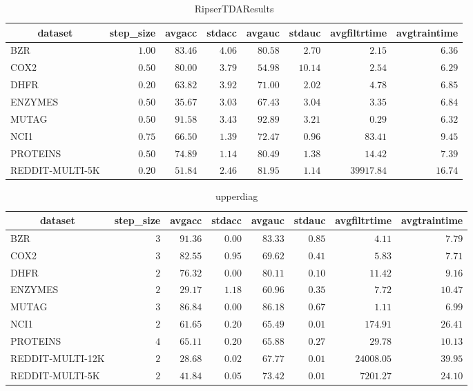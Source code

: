 \begin{table}[!tbp]
\caption{RipserTDAResults\label{RipserTDAResults}} 
{\centering
\begin{tabular}{lrrrrrrr}
\hline\hline
\multicolumn{1}{c}{dataset}&\multicolumn{1}{c}{step_size}&\multicolumn{1}{c}{avgacc}&\multicolumn{1}{c}{stdacc}&\multicolumn{1}{c}{avgauc}&\multicolumn{1}{c}{stdauc}&\multicolumn{1}{c}{avgfiltrtime}&\multicolumn{1}{c}{avgtraintime}\tabularnewline
\hline
BZR&$1.00$&$83.46$&$4.06$&$80.58$&$ 2.70$&$    2.15$&$ 6.36$\tabularnewline
COX2&$0.50$&$80.00$&$3.79$&$54.98$&$10.14$&$    2.54$&$ 6.29$\tabularnewline
DHFR&$0.20$&$63.82$&$3.92$&$71.00$&$ 2.02$&$    4.78$&$ 6.85$\tabularnewline
ENZYMES&$0.50$&$35.67$&$3.03$&$67.43$&$ 3.04$&$    3.35$&$ 6.84$\tabularnewline
MUTAG&$0.50$&$91.58$&$3.43$&$92.89$&$ 3.21$&$    0.29$&$ 6.32$\tabularnewline
NCI1&$0.75$&$66.50$&$1.39$&$72.47$&$ 0.96$&$   83.41$&$ 9.45$\tabularnewline
PROTEINS&$0.50$&$74.89$&$1.14$&$80.49$&$ 1.38$&$   14.42$&$ 7.39$\tabularnewline
REDDIT-MULTI-5K&$0.20$&$51.84$&$2.46$&$81.95$&$ 1.14$&$39917.84$&$16.74$\tabularnewline
\hline
\end{tabular}}
\end{table}
\begin{table}[!tbp]
\caption{upperdiag\label{upperdiag}} 
{\centering
\begin{tabular}{lrrrrrrr}
\hline\hline
\multicolumn{1}{c}{dataset}&\multicolumn{1}{c}{step_size}&\multicolumn{1}{c}{avgacc}&\multicolumn{1}{c}{stdacc}&\multicolumn{1}{c}{avgauc}&\multicolumn{1}{c}{stdauc}&\multicolumn{1}{c}{avgfiltrtime}&\multicolumn{1}{c}{avgtraintime}\tabularnewline
\hline
BZR&$3$&$91.36$&$0.00$&$83.33$&$0.85$&$    4.11$&$ 7.79$\tabularnewline
COX2&$3$&$82.55$&$0.95$&$69.62$&$0.41$&$    5.83$&$ 7.71$\tabularnewline
DHFR&$2$&$76.32$&$0.00$&$80.11$&$0.10$&$   11.42$&$ 9.16$\tabularnewline
ENZYMES&$2$&$29.17$&$1.18$&$60.96$&$0.35$&$    7.72$&$10.47$\tabularnewline
MUTAG&$3$&$86.84$&$0.00$&$86.18$&$0.67$&$    1.11$&$ 6.99$\tabularnewline
NCI1&$2$&$61.65$&$0.20$&$65.49$&$0.01$&$  174.91$&$26.41$\tabularnewline
PROTEINS&$4$&$65.11$&$0.20$&$65.88$&$0.27$&$   29.78$&$10.13$\tabularnewline
REDDIT-MULTI-12K&$2$&$28.68$&$0.02$&$67.77$&$0.01$&$24008.05$&$39.95$\tabularnewline
REDDIT-MULTI-5K&$2$&$41.84$&$0.05$&$73.42$&$0.01$&$ 7201.27$&$24.10$\tabularnewline
\hline
\end{tabular}}
\end{table}
